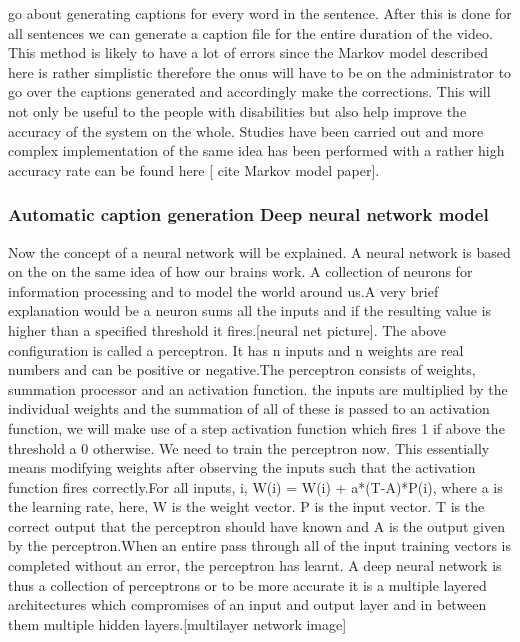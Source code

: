 \documentclass[sigconf]{acmart}
\begin{document}
go about generating captions for every word in the sentence. After this is done for all sentences we can generate a caption file for the entire duration of the video. This method is likely to have a lot of errors since the Markov model described here is rather simplistic therefore the onus will have to be on the administrator to go over the captions generated and accordingly make the corrections. This will not only be useful to the people with disabilities but also help improve the accuracy of the system on the whole. Studies have been carried out and more complex implementation of the same idea has been performed with a rather high accuracy rate can be found here [ cite Markov model paper].
\newline
\subsubsection{Automatic caption generation Deep neural network model}
Now the concept of a neural network will be explained. A neural network is based on the on the same idea of how our brains work. A collection of neurons for information processing and to model the world around us.A very brief explanation would be a neuron sums all the inputs and if the resulting value is higher than a specified threshold it fires.[neural net picture].
The above configuration is called a perceptron. It has n inputs and n weights are real numbers and can be positive or negative.The perceptron consists of weights, summation processor and an activation function. the inputs are multiplied by the individual weights and the summation of all of these is passed to an activation function, we will make use of a step activation function which fires 1 if above the threshold a 0 otherwise. We need to train the perceptron now. This essentially means modifying weights after observing the inputs such that the activation function fires correctly.For all inputs, i, W(i) = W(i) + a*(T-A)*P(i), where a is the learning rate, here, W is the weight vector. P is the input vector. T is the correct output that the perceptron should have known and A is the output given by the perceptron.When an entire pass through all of the input training vectors is completed without an error, the perceptron has learnt. A deep neural network is thus a collection of perceptrons or to be more accurate it is a multiple layered architectures which compromises of an input and output layer and in between them multiple hidden layers.[multilayer network image]
\end{document}

